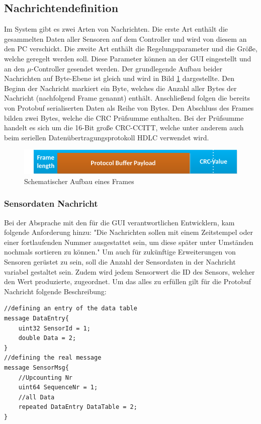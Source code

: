 \subsection{Nachrichtendefinition}
Im System gibt es zwei Arten von Nachrichten. Die erste Art enthält die gesammelten Daten aller Sensoren auf dem Controller und wird von diesem an den PC verschickt. Die zweite Art enthält die Regelungsparameter und die Größe, welche geregelt werden soll. Diese Parameter können an der GUI eingestellt und an den $\mu$-Controller gesendet werden. Der grundlegende Aufbau beider Nachrichten auf Byte-Ebene ist gleich und wird in Bild \ref{fig:FrameOv} dargestellte. Den Beginn der Nachricht markiert ein Byte, welches die Anzahl aller Bytes der Nachricht (nachfolgend Frame genannt) enthält. Anschließend folgen die bereits von Protobuf serialiserten Daten als Reihe von Bytes. Den Abschluss des Frames bilden zwei Bytes, welche die CRC Prüfsumme enthalten. Bei der Prüfsumme handelt es sich um die 16-Bit große CRC-CCITT, welche unter anderem auch beim seriellen Datenübertragungsprotokoll HDLC verwendet wird. \cite[Absatz 1]{hdlcCrc}
\begin{figure}[h]
  \includegraphics[width=\textwidth]{MessageFormat}
  \caption{Schematischer Aufbau eines Frames}
  \label{fig:FrameOv}
\end{figure}
\subsubsection{Sensordaten Nachricht}
Bei der Absprache mit den für die GUI verantwortlichen Entwicklern, kam folgende Anforderung hinzu: "Die Nachrichten sollen mit einem Zeitstempel oder einer fortlaufenden Nummer ausgestattet sein, um diese später unter Umständen nochmals sortieren zu können." Um auch für zukünftige Erweiterungen von Sensoren gerüstet zu sein, soll die Anzahl der Sensordaten in der Nachricht variabel gestaltet sein. Zudem wird jedem Sensorwert die ID des Sensors, welcher den Wert produzierte, zugeordnet. Um das alles zu erfüllen gilt für die Protobuf Nachricht folgende Beschreibung:
\begin{lstlisting}[caption=Beschreibung der Sensordaten Nachricht, label=lst:protoData]
//defining an entry of the data table
message DataEntry{
	uint32 SensorId = 1;
	double Data = 2;
}
//defining the real message
message SensorMsg{
	//Upcounting Nr
	uint64 SequenceNr = 1;
	//all Data
	repeated DataEntry DataTable = 2;
}
\end{lstlisting}
